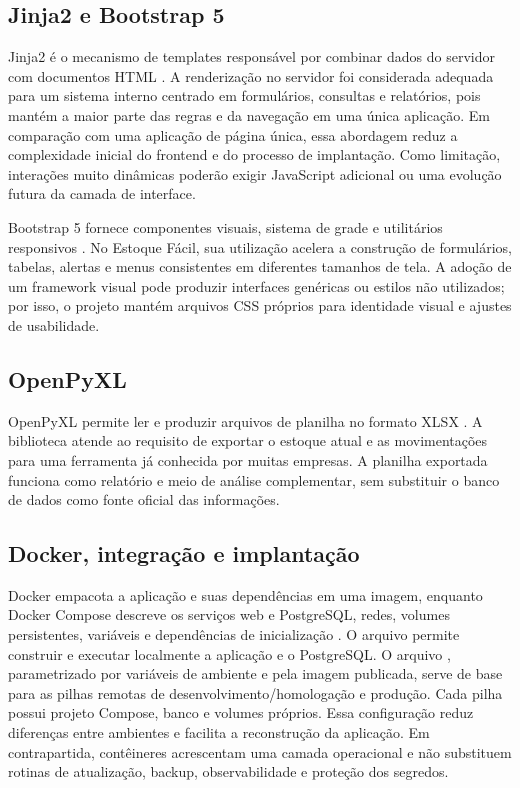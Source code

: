 \subsection{Jinja2 e Bootstrap 5}

Jinja2 é o mecanismo de templates responsável por combinar dados do servidor com documentos HTML \cite{JinjaDocs}. A renderização no servidor foi considerada adequada para um sistema interno centrado em formulários, consultas e relatórios, pois mantém a maior parte das regras e da navegação em uma única aplicação. Em comparação com uma aplicação de página única, essa abordagem reduz a complexidade inicial do frontend e do processo de implantação. Como limitação, interações muito dinâmicas poderão exigir JavaScript adicional ou uma evolução futura da camada de interface.

Bootstrap 5 fornece componentes visuais, sistema de grade e utilitários responsivos \cite{BootstrapDocs}. No Estoque Fácil, sua utilização acelera a construção de formulários, tabelas, alertas e menus consistentes em diferentes tamanhos de tela. A adoção de um framework visual pode produzir interfaces genéricas ou estilos não utilizados; por isso, o projeto mantém arquivos CSS próprios para identidade visual e ajustes de usabilidade.

\subsection{OpenPyXL}

OpenPyXL permite ler e produzir arquivos de planilha no formato XLSX \cite{OpenPyXLDocs}. A biblioteca atende ao requisito de exportar o estoque atual e as movimentações para uma ferramenta já conhecida por muitas empresas. A planilha exportada funciona como relatório e meio de análise complementar, sem substituir o banco de dados como fonte oficial das informações.

\subsection{Docker, integração e implantação}

Docker empacota a aplicação e suas dependências em uma imagem, enquanto Docker Compose descreve os serviços web e PostgreSQL, redes, volumes persistentes, variáveis e dependências de inicialização \cite{DockerComposeDocs}. O arquivo  permite construir e executar localmente a aplicação e o PostgreSQL. O arquivo , parametrizado por variáveis de ambiente e pela imagem publicada, serve de base para as pilhas remotas de desenvolvimento/homologação e produção. Cada pilha possui projeto Compose, banco e volumes próprios. Essa configuração reduz diferenças entre ambientes e facilita a reconstrução da aplicação. Em contrapartida, contêineres acrescentam uma camada operacional e não substituem rotinas de atualização, backup, observabilidade e proteção dos segredos.

